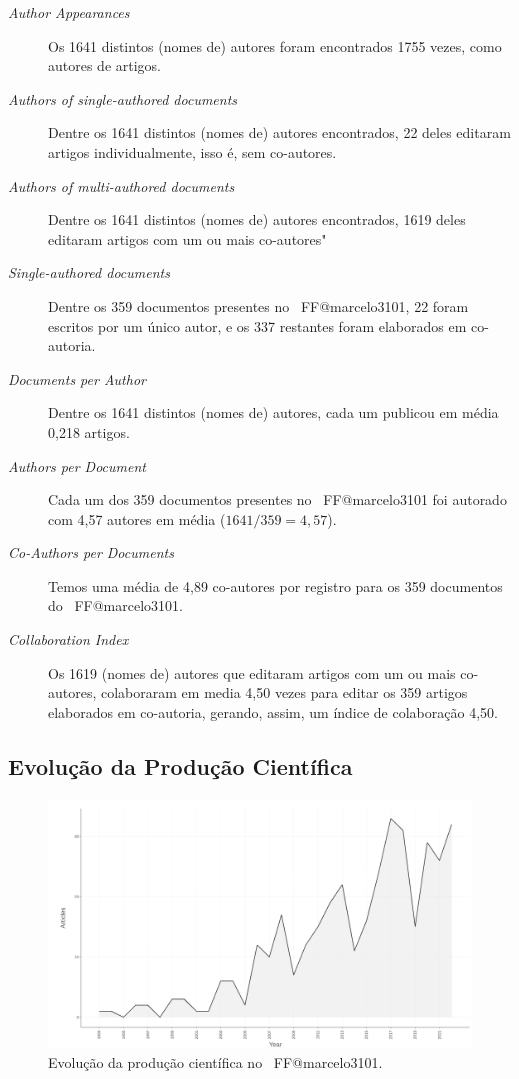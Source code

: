 \begin{description}
    \item [\textit{Author Appearances}] Os 1641 distintos (nomes de) autores foram encontrados 1755 vezes, como autores de artigos.
    \item [\textit{Authors of single-authored documents}] Dentre os 1641 distintos (nomes de) autores encontrados, 22 deles editaram artigos individualmente, isso é, sem co-autores.
    \item [\textit{Authors of multi-authored documents}] Dentre os 1641 distintos (nomes de) autores encontrados, 1619 deles editaram artigos com um ou mais co-autores"
    \item [\textit{Single-authored documents}] Dentre os 359 documentos presentes no \dataset\   FF@marcelo3101, 22 foram escritos por um único autor, e os 337 restantes foram elaborados em co-autoria.
    \item [\textit{Documents per Author}] Dentre os 1641 distintos (nomes de) autores, cada um publicou em média 0,218 artigos.
    \item [\textit{Authors per Document}] Cada um dos 359 documentos presentes no \dataset\   FF@marcelo3101 foi autorado com 4,57 autores em média ($1641 / 359 = 4,57$).
    \item [\textit{Co-Authors per Documents}] Temos uma média de 4,89 co-autores por registro para os 359 documentos do \dataset\   FF@marcelo3101.
    \item [\textit{Collaboration Index}] Os 1619 (nomes de) autores que editaram artigos com um ou mais co-autores, colaboraram em media 4,50 vezes para editar os 359 artigos elaborados em co-autoria, gerando, assim, um índice de colaboração 4,50. 
\end{description}



\subsection{Evolução da Produção Científica}

\begin{figure}
    \centering
    \includegraphics[width=1\textwidth]{exploratory-data-analysis/marcelo3101/PesqBibliogr/ForestFire/WoS-20221204/assets/AnnualScientificProductionFFMarcelo3101.png}
    \caption{Evolução da produção científica no \dataset\   FF@marcelo3101.}
    \label{fig:evol:anual:FF@marcelo3101}
\end{figure}


